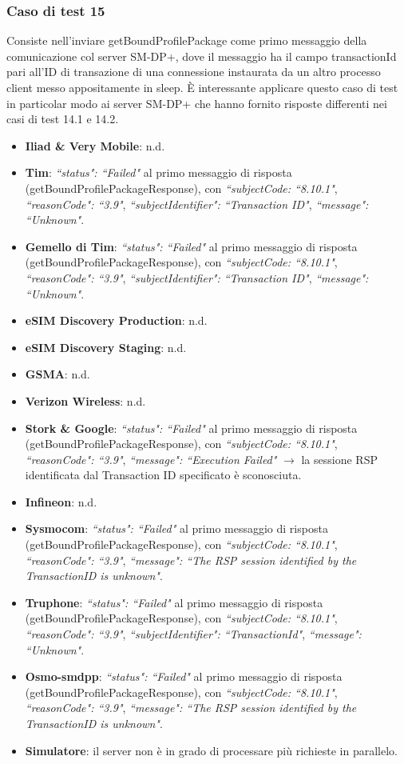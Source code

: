 \documentclass[10pt, oneside]{book}
\begin{document}
\subsubsection{Caso di test 15}
Consiste nell'inviare getBoundProfilePackage come primo messaggio della comunicazione col server SM-DP+, dove il messaggio ha il campo transactionId pari all'ID di transazione di una connessione instaurata da un altro processo client messo appositamente in sleep. È interessante applicare questo caso di test in particolar modo ai server SM-DP+ che hanno fornito risposte differenti nei casi di test 14.1 e 14.2.
\begin{itemize}
\item \textbf{Iliad \& Very Mobile}: n.d.
\item \textbf{Tim}: \textit{``status": ``Failed"} al primo messaggio di risposta (getBoundProfilePackageResponse), con \textit{``subjectCode: ``8.10.1"}, \textit{``reasonCode": ``3.9"}, \textit{``subjectIdentifier": ``Transaction ID"}, \textit{``message": ``Unknown"}.
\item \textbf{Gemello di Tim}: \textit{``status": ``Failed"} al primo messaggio di risposta (getBoundProfilePackageResponse), con \textit{``subjectCode: ``8.10.1"}, \textit{``reasonCode": ``3.9"}, \textit{``subjectIdentifier": ``Transaction ID"}, \textit{``message": ``Unknown"}.
\item \textbf{eSIM Discovery Production}: n.d.
\item \textbf{eSIM Discovery Staging}: n.d.
\item \textbf{GSMA}: n.d.
\item \textbf{Verizon Wireless}: n.d.
\item \textbf{Stork \& Google}: \textit{``status": ``Failed"} al primo messaggio di risposta (getBoundProfilePackageResponse), con \textit{``subjectCode: ``8.10.1"}, \textit{``reasonCode": ``3.9"}, \textit{``message": ``Execution Failed"} $\rightarrow$ la sessione RSP identificata dal Transaction ID specificato è sconosciuta.
\item \textbf{Infineon}: n.d.
\item \textbf{Sysmocom}: \textit{``status": ``Failed"} al primo messaggio di risposta (getBoundProfilePackageResponse), con \textit{``subjectCode: ``8.10.1"}, \textit{``reasonCode": ``3.9"}, \textit{``message": ``The RSP session identified by the TransactionID is unknown"}.
\item \textbf{Truphone}: \textit{``status": ``Failed"} al primo messaggio di risposta (getBoundProfilePackageResponse), con \textit{``subjectCode: ``8.10.1"}, \textit{``reasonCode": ``3.9"}, \textit{``subjectIdentifier": ``TransactionId"}, \textit{``message": ``Unknown"}.
\item \textbf{Osmo-smdpp}: \textit{``status": ``Failed"} al primo messaggio di risposta (getBoundProfilePackageResponse), con \textit{``subjectCode: ``8.10.1"}, \textit{``reasonCode": ``3.9"}, \textit{``message": ``The RSP session identified by the TransactionID is unknown"}.
\item \textbf{Simulatore}: il server non è in grado di processare più richieste in parallelo.
\end{itemize}
\end{document}

